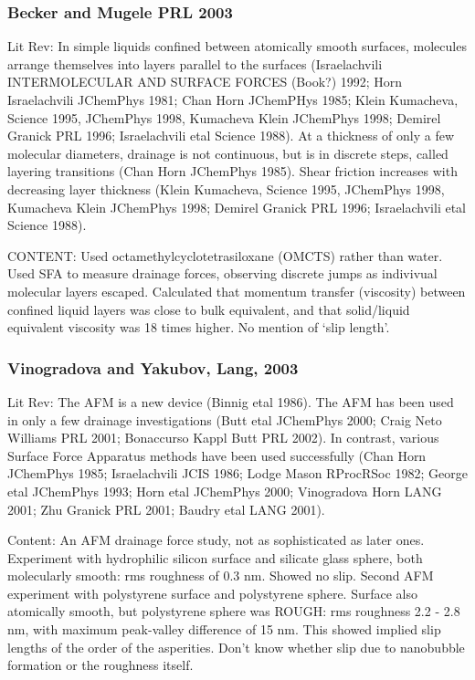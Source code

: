 \documentclass[twocolumn]{article}
\begin{document}
\subsubsection*{Becker and Mugele PRL 2003}
Lit Rev: In simple liquids confined between atomically smooth surfaces, molecules arrange themselves into layers parallel to the surfaces (Israelachvili INTERMOLECULAR AND SURFACE FORCES (Book?) 1992; Horn Israelachvili JChemPhys 1981; Chan Horn JChemPHys 1985; Klein Kumacheva, Science 1995, JChemPhys 1998, Kumacheva Klein JChemPhys 1998; Demirel Granick PRL 1996; Israelachvili etal Science 1988). At a thickness of only a few molecular diameters, drainage is not continuous, but is in discrete steps, called layering transitions (Chan Horn JChemPhys 1985). Shear friction increases with decreasing layer thickness (Klein Kumacheva, Science 1995, JChemPhys 1998, Kumacheva Klein JChemPhys 1998; Demirel Granick PRL 1996; Israelachvili etal Science 1988).

CONTENT: Used octamethylcyclotetrasiloxane (OMCTS) rather than water. Used SFA to measure drainage forces, observing discrete jumps as indivivual molecular layers escaped. Calculated that momentum transfer (viscosity) between confined liquid layers was close to bulk equivalent, and that solid/liquid equivalent viscosity was 18 times higher.  No mention of `slip length'.

\subsubsection*{Vinogradova and Yakubov, Lang, 2003}
Lit Rev: The AFM is a new device (Binnig etal 1986). The AFM has been used in only a few drainage investigations (Butt etal JChemPhys 2000; Craig Neto Williams PRL 2001; Bonaccurso Kappl Butt PRL 2002). In contrast, various Surface Force Apparatus methods have been used successfully (Chan Horn JChemPhys 1985; Israelachvili JCIS 1986; Lodge Mason RProcRSoc 1982; George etal JChemPhys 1993; Horn etal JChemPhys 2000; Vinogradova Horn LANG 2001; Zhu Granick PRL 2001; Baudry etal LANG 2001).

Content:  An AFM drainage force study, not as sophisticated as later ones.  Experiment with hydrophilic silicon surface and silicate glass sphere, both molecularly smooth: rms roughness of 0.3 nm. Showed no slip.  Second AFM experiment with polystyrene surface and polystyrene sphere. Surface also atomically smooth, but polystyrene sphere was ROUGH: rms roughness 2.2 - 2.8 nm, with maximum peak-valley difference of 15 nm.  This showed implied slip lengths of the order of the asperities. Don't know whether slip due to nanobubble formation or the roughness itself.
\end{document}
